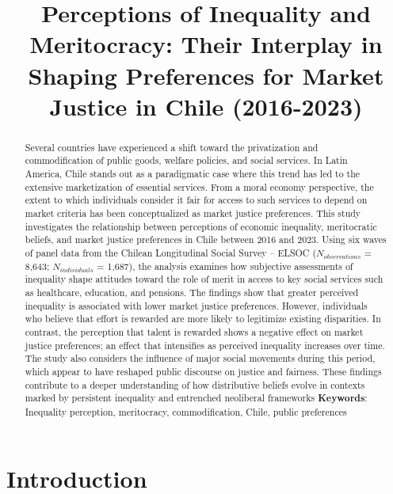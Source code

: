 \documentclass[
  12pt,
]{article}
\title{Perceptions of Inequality and Meritocracy: Their Interplay in
Shaping Preferences for Market Justice in Chile (2016-2023)}
\author{ }
\date{}
\begin{document}
\maketitle
\begin{abstract}
Several countries have experienced a shift toward the privatization and
commodification of public goods, welfare policies, and social services.
In Latin America, Chile stands out as a paradigmatic case where this
trend has led to the extensive marketization of essential services. From
a moral economy perspective, the extent to which individuals consider it
fair for access to such services to depend on market criteria has been
conceptualized as market justice preferences. This study investigates
the relationship between perceptions of economic inequality,
meritocratic beliefs, and market justice preferences in Chile between
2016 and 2023. Using six waves of panel data from the Chilean
Longitudinal Social Survey -- ELSOC (\(N_{observations}\) = 8,643;
\(N_{individuals}\) = 1,687), the analysis examines how subjective
assessments of inequality shape attitudes toward the role of merit in
access to key social services such as healthcare, education, and
pensions. The findings show that greater perceived inequality is
associated with lower market justice preferences. However, individuals
who believe that effort is rewarded are more likely to legitimize
existing disparities. In contrast, the perception that talent is
rewarded shows a negative effect on market justice preferences; an
effect that intensifies as perceived inequality increases over time. The
study also considers the influence of major social movements during this
period, which appear to have reshaped public discourse on justice and
fairness. These findings contribute to a deeper understanding of how
distributive beliefs evolve in contexts marked by persistent inequality
and entrenched neoliberal frameworks \newline \textbf{Keywords}:
Inequality perception, meritocracy, commodification, Chile, public
preferences
\end{abstract}

\section{Introduction}\label{introduction}
\end{document}
